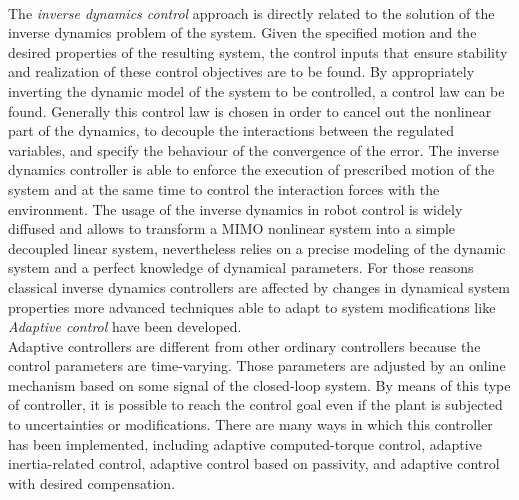 \\
The \textit{inverse dynamics control} approach is directly related to the solution of the inverse dynamics problem of the system. Given the specified motion and the desired properties of the resulting system, the control inputs that ensure stability and realization of these control objectives are to be found. By appropriately inverting the dynamic model of the system to be controlled, a control law can be found. Generally this control law is chosen in order to cancel out the nonlinear part of the dynamics, to decouple the interactions between the regulated variables, and specify the behaviour of the convergence of the error. The inverse dynamics controller is able to enforce the execution of prescribed motion of the system and at the same time to control the interaction forces with the environment.
The usage of the inverse dynamics in robot control is widely diffused and allows to transform a MIMO nonlinear system into a simple decoupled linear system, nevertheless relies on a precise modeling of the dynamic system and a perfect knowledge of dynamical parameters. For those reasons classical inverse dynamics controllers are affected by changes in dynamical system properties more advanced techniques able to adapt to system modifications like \textit{Adaptive control} have been developed.  
\\
Adaptive controllers are different from other ordinary controllers because the control parameters are time-varying. Those parameters are adjusted by an online mechanism based on some signal of the closed-loop system. By means of this type of controller, it is possible to reach the control goal even if the plant is subjected to uncertainties or modifications. There are many ways in which this controller has been implemented, including adaptive computed-torque control, adaptive inertia-related control, adaptive control based on passivity, and adaptive control with desired compensation. 

